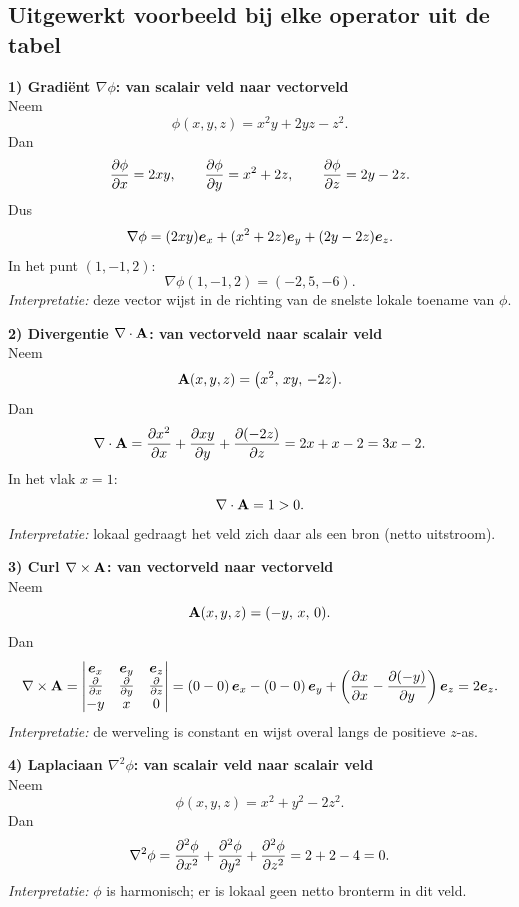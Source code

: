 \documentclass[11pt,a4paper]{article}
\begin{document}
    \subsection{Uitgewerkt voorbeeld bij elke operator uit de tabel}
    \begin{tcolorbox}[colback=blue!4,colframe=blue!35,title=Van type veld naar concrete berekening]
        \textbf{1) Gradi\"ent \(\nabla\phi\): van scalair veld naar vectorveld}\\
        Neem
        \[
            \phi(x,y,z)=x^2y+2yz-z^2.
        \]
        Dan
        \[
            \pdv{\phi}{x}=2xy,\qquad
            \pdv{\phi}{y}=x^2+2z,\qquad
            \pdv{\phi}{z}=2y-2z.
        \]
        Dus
        \[
            \nabla\phi=(2xy)\vb*{e}_x+(x^2+2z)\vb*{e}_y+(2y-2z)\vb*{e}_z.
        \]
        In het punt \((1,-1,2)\):
        \[
            \nabla\phi(1,-1,2)=(-2,5,-6).
        \]
        \emph{Interpretatie:} deze vector wijst in de richting van de snelste lokale toename van \(\phi\).

        \medskip
        \textbf{2) Divergentie \(\nabla\cdot\vb{A}\): van vectorveld naar scalair veld}\\
        Neem
        \[
            \vb{A}(x,y,z)=\big(x^2,\,xy,\,-2z\big).
        \]
        Dan
        \[
            \nabla\cdot\vb{A}=\pdv{x^2}{x}+\pdv{xy}{y}+\pdv{(-2z)}{z}=2x+x-2=3x-2.
        \]
        In het vlak \(x=1\):
        \[
            \nabla\cdot\vb{A}=1>0.
        \]
        \emph{Interpretatie:} lokaal gedraagt het veld zich daar als een bron (netto uitstroom).

        \medskip
        \textbf{3) Curl \(\nabla\times\vb{A}\): van vectorveld naar vectorveld}\\
        Neem
        \[
            \vb{A}(x,y,z)=(-y,\,x,\,0).
        \]
        Dan
        \[
            \nabla\times\vb{A}=
            \begin{vmatrix}
                \vb*{e}_x & \vb*{e}_y & \vb*{e}_z\\
                \pdv{}{x} & \pdv{}{y} & \pdv{}{z}\\
                -y & x & 0
            \end{vmatrix}
            =\left(0-0\right)\vb*{e}_x-\left(0-0\right)\vb*{e}_y
            +\left(\pdv{x}{x}-\pdv{(-y)}{y}\right)\vb*{e}_z
            =2\vb*{e}_z.
        \]
        \emph{Interpretatie:} de werveling is constant en wijst overal langs de positieve \(z\)-as.

        \medskip
        \textbf{4) Laplaciaan \(\nabla^2\phi\): van scalair veld naar scalair veld}\\
        Neem
        \[
            \phi(x,y,z)=x^2+y^2-2z^2.
        \]
        Dan
        \[
            \nabla^2\phi=\pdv[2]{\phi}{x}+\pdv[2]{\phi}{y}+\pdv[2]{\phi}{z}=2+2-4=0.
        \]
        \emph{Interpretatie:} \(\phi\) is harmonisch; er is lokaal geen netto bronterm in dit veld.
    \end{tcolorbox}
\end{document}

